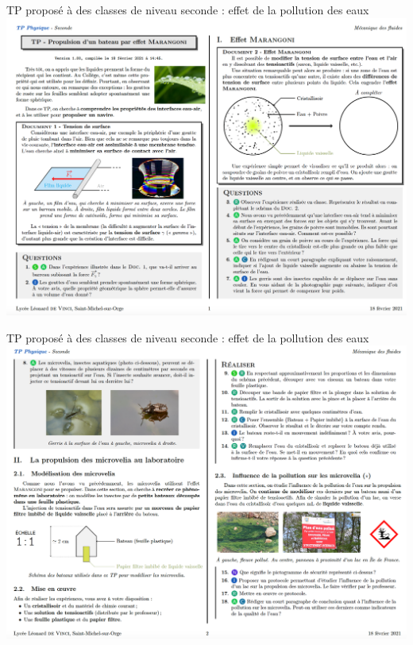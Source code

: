 \documentclass[aspectratio=169,10pt]{beamer}
\begin{document}
\begin{frame}{TP proposé à des classes de niveau seconde : effet de la pollution des eaux}
  \includegraphics[width=\linewidth]{TP_Marangoni1.png}
\end{frame}

\begin{frame}{TP proposé à des classes de niveau seconde : effet de la pollution des eaux}
  \includegraphics[width=\linewidth]{TP_Marangoni2.png}
\end{frame}
\end{document}
